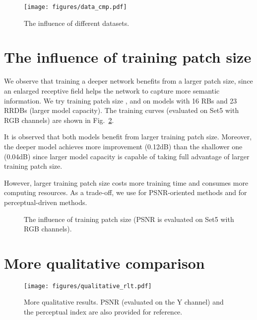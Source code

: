 \documentclass[runningheads]{llncs}
\begin{document}
\begin{figure}[htbp]
	\vspace{-0.4cm}
	\begin{center}
\texttt{[image: figures/data\_cmp.pdf]}
	\end{center}
	\vspace{-0.4cm}
	\caption{The influence of different datasets.}
	\vspace{-0.5cm}
	\label{fig:data_cmp}
\end{figure}


\section{The influence of training patch size} \label{sec:influence_patch_size}

We observe that training a deeper network benefits from a larger patch size, since an enlarged receptive field helps 
the network to capture more semantic information. 
We try training patch size ,  and  on models with 16 RBs and 23 RRDBs (larger 
model capacity). The training curves (evaluated on Set5 with RGB channels) are shown in Fig.~\ref{fig:patch_size}. 

It is observed that both models benefit from larger training patch size.
Moreover, the deeper model achieves more improvement (0.12dB) than the shallower one (0.04dB) since
larger model capacity is capable of taking full advantage of larger training patch size.

However, larger training patch size costs more training time and consumes more computing resources. 
As a trade-off, we use  for PSNR-oriented methods and  for perceptual-driven methods.

\begin{figure}[htbp]\vspace{-0.7cm}
	\centering
	\qquad
	\caption{The influence of training patch size (PSNR is evaluated on Set5 with RGB \mbox{channels}).}\label{fig:patch_size}\vspace{-0.5cm}
\end{figure}

\section{More qualitative comparison} \label{sec:qualitative_cmp}

\begin{figure}[htbp]
	\begin{center}
\texttt{[image: figures/qualitative\_rlt.pdf]}
	\end{center}
	\vspace{-0.4cm}
	\caption{More qualitative results. PSNR (evaluated on the Y channel) and the 
		perceptual index are also provided for reference.}
	\label{fig:intro_cmp}
\end{figure}
\end{document}
